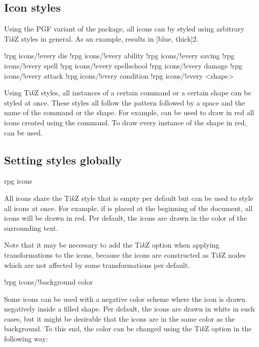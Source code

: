 \documentclass[a4paper]{article}
\begin{document}
\subsection{Icon styles}

Using the PGF variant of the package, all icons can by styled using arbitrary Ti\emph{k}Z styles in general. As an example,  results in [blue, thick]{2}.

\begin{macrodef}
!rpg icons/!every die
!rpg icons/!every ability
!rpg icons/!every saving
!rpg icons/!every spell
!rpg icons/!every spellschool
!rpg icons/!every damage
!rpg icons/!every attack
!rpg icons/!every condition
!rpg icons/!every <shape>
\end{macrodef}
Using Ti\emph{k}Z styles, all instances of a certain command or a certain shape can be styled at once. These styles all follow the pattern  followed by a space and the name of the command or the shape. For example,  can be used to draw in red all icons created using the \macro{\die} command. To draw every instance of the  shape in red,  can be used.

\subsection{Setting styles globally}

\begin{macrodef}rpg icons\end{macrodef}
All icons share the Ti\emph{k}Z style  that is empty per default but can be used to style all icons at once. For example, if  is placed at the beginning of the document, all icons will be drawn in red. Per default, the icons are drawn in the color of the surrounding text.

Note that it may be necessary to add the Ti\emph{k}Z option  when applying transformations to the icons, because the icons are constructed as Ti\emph{k}Z nodes which are not affected by some transformations per default.

\begin{macrodef}!rpg icons/!background color\end{macrodef}
Some icons can be used with a negative color scheme where the icon is drawn negatively inside a filled shape. Per default, the icons are drawn in white in such cases, but it might be desirable that the icons are in the same color as the background. To this end, the color can be changed using the Ti\emph{k}Z option  in the following way:
\end{document}
